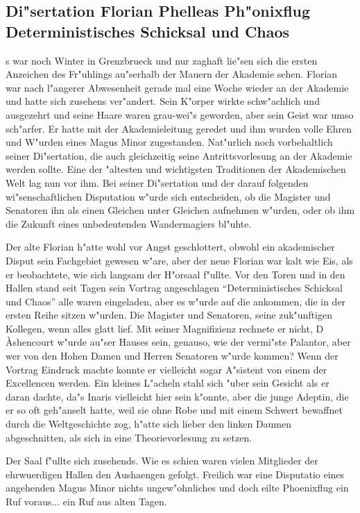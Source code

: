\documentclass[a5paper,8pt]{book}
\begin{document}
\newpage

\subsection{\fraklines Di"sertation Florian Phelleas Ph"onixflug Deterministisches Schicksal und Chaos}

s war noch Winter in Grenzbrueck und nur zaghaft lie"sen sich die ersten Anzeichen des Fr"uhlings au"serhalb der Mauern der Akademie sehen. Florian war nach l"angerer Abwesenheit gerade mal eine Woche wieder an der Akademie und hatte sich zusehens ver"andert. Sein K"orper wirkte schw"achlich und ausgezehrt und seine Haare waren grau-wei"s geworden, aber sein Geist war umso sch"arfer. 
Er hatte mit der Akademieleitung geredet und ihm wurden volle Ehren und W"urden eines Magus Minor zugestanden. Nat"urlich noch vorbehaltlich seiner Di"sertation, die auch gleichzeitig seine Antrittsvorlesung an der Akademie werden sollte. Eine der "altesten und wichtigsten Traditionen der Akademischen Welt lag nun vor ihm. Bei seiner Di"sertation und der darauf folgenden wi"senschaftlichen Disputation w"urde sich entscheiden, ob die Magister und Senatoren ihn als einen Gleichen unter Gleichen aufnehmen w"urden, oder ob ihm die Zukunft eines unbedeutenden Wandermagiers bl"uhte.

Der alte Florian h"atte wohl vor Angst geschlottert, obwohl ein akademischer Disput sein Fachgebiet gewesen w"are, aber der neue Florian war kalt wie Eis, als er beobachtete, wie sich langsam der H"orsaal f"ullte. Vor den Toren und in den Hallen stand seit Tagen sein Vortrag angeschlagen ``Deterministisches Schicksal und Chaos'' alle waren eingeladen, aber es w"urde auf die ankommen, die in der ersten Reihe sitzen w"urden.
Die Magister und Senatoren, seine zuk"unftigen Kollegen, wenn alles glatt lief.
Mit seiner Magnifizienz rechnete er nicht, D \`{A}shencourt w"urde au"ser Hauses sein, genauso, wie der vermi"ste Palantor, aber wer von den Hohen Damen und Herren Senatoren w"urde kommen? Wenn der Vortrag Eindruck machte konnte er vielleicht sogar A"sistent von einem der Excellencen werden.
Ein kleines L"acheln stahl sich "uber sein Gesicht als er daran dachte, da"s Inaris vielleicht hier sein k"onnte, aber die junge Adeptin, die er so oft geh"anselt hatte, weil sie ohne Robe und mit einem Schwert bewaffnet durch die Weltgeschichte zog, h"atte sich lieber den linken Daumen abgeschnitten, als sich in eine Theorievorlesung zu setzen.

Der Saal f"ullte sich zusehends. Wie es schien waren vielen Mitglieder der ehrwuerdigen Hallen den Aushaengen gefolgt. Freilich war eine Disputatio eines angehenden Magus Minor nichts ungew"ohnliches und doch eilte Phoenixflug ein Ruf voraus... ein Ruf aus alten Tagen.
\end{document}
